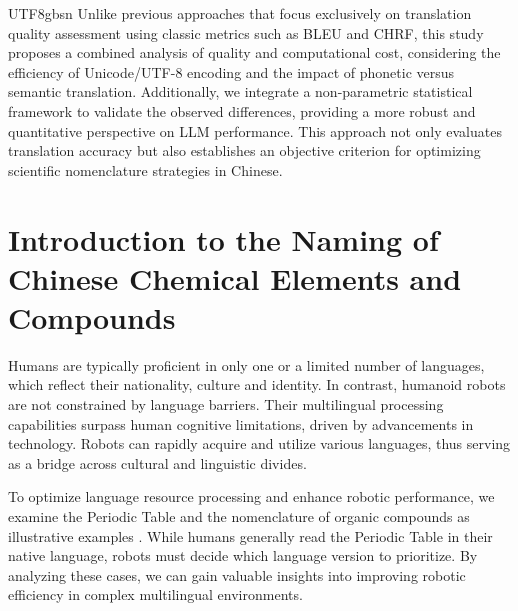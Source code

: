 \documentclass[conference]{IEEEtran}
\begin{document}
\begin{CJK*}{UTF8}{gbsn}
\color{blue}
Unlike previous approaches that focus exclusively on translation quality assessment using classic metrics such as BLEU and CHRF, this study proposes a combined analysis of quality and computational cost, considering the efficiency of Unicode/UTF-8 encoding and the impact of phonetic versus semantic translation. Additionally, we integrate a non-parametric statistical framework to validate the observed differences, providing a more robust and quantitative perspective on LLM performance. This approach not only evaluates translation accuracy but also establishes an objective criterion for optimizing scientific nomenclature strategies in Chinese.
\color{black}

\section{Introduction to the Naming of Chinese Chemical Elements and Compounds}
\label{headings}


Humans are typically proficient in only one or a limited number of languages, which reflect their nationality, culture and identity. In contrast, humanoid robots are not constrained by language barriers. Their multilingual processing capabilities surpass human cognitive limitations, driven by advancements in technology. Robots can rapidly acquire and utilize various languages, thus serving as a bridge across cultural and linguistic divides.

To optimize language resource processing and enhance robotic performance, we examine the Periodic Table and the nomenclature of organic compounds as illustrative examples \citep{wang2010nomencl}. While humans generally read the Periodic Table in their native language, robots must decide which language version to prioritize. By analyzing these cases, we can gain valuable insights into improving robotic efficiency in complex multilingual environments.


\end{CJK*}
\end{document}
